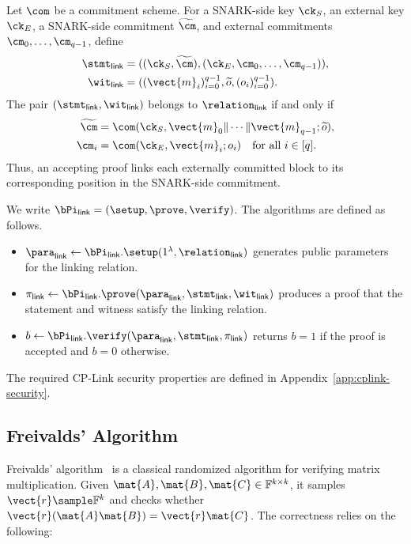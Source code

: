 Let \(\com\) be a commitment scheme. For a SNARK-side key \(\ck_S\), an
external key \(\ck_E\), a SNARK-side commitment \(\widetilde{\cm}\), and
external commitments \(\cm_0,\ldots,\cm_{q-1}\), define
\[
\begin{aligned}
\stmt_{\mathsf{link}}
&=
((\ck_S,\widetilde{\cm}),
(\ck_E,\cm_0,\ldots,\cm_{q-1})),\\
\wit_{\mathsf{link}}
&=
((\vect{m}_i)_{i=0}^{q-1},\widetilde{o},(o_i)_{i=0}^{q-1}).
\end{aligned}
\]
The pair \((\stmt_{\mathsf{link}},\wit_{\mathsf{link}})\) belongs to
\(\relation_{\mathsf{link}}\) if and only if
\[
\begin{aligned}
\widetilde{\cm}
&=
\com(\ck_S,\vect{m}_0\|\cdots\|\vect{m}_{q-1};\widetilde{o}),\\
\cm_i
&=
\com(\ck_E,\vect{m}_i;o_i)
\quad \text{for all }i\in[q].
\end{aligned}
\]
Thus, an accepting proof links each externally committed block to its
corresponding position in the SNARK-side commitment.

We write \(\bPi_{\mathsf{link}}=(\setup,\prove,\verify)\). The algorithms are
defined as follows.
\begin{itemize}[leftmargin=*,nosep]
  \item \(\para_{\mathsf{link}}\gets
  \bPi_{\mathsf{link}}.\setup(1^\lambda,\relation_{\mathsf{link}})\) generates
  public parameters for the linking relation.

  \item \(\pi_{\mathsf{link}}\gets
  \bPi_{\mathsf{link}}.\prove(
  \para_{\mathsf{link}},\stmt_{\mathsf{link}},\wit_{\mathsf{link}})\) produces
  a proof that the statement and witness satisfy the linking relation.

  \item \(b\gets\bPi_{\mathsf{link}}.\verify(
  \para_{\mathsf{link}},\stmt_{\mathsf{link}},\pi_{\mathsf{link}})\) returns
  \(b=1\) if the proof is accepted and \(b=0\) otherwise.
\end{itemize}
The required CP-Link security properties are defined in
Appendix~\ref{app:cplink-security}.

\subsection{Freivalds' Algorithm}
\label{sec:prelim-freivalds}

Freivalds' algorithm~\cite{freivalds1977probabilistic} is a classical randomized algorithm for verifying matrix multiplication.
Given $\mat{A}, \mat{B}, \mat{C} \in \mathbb{F}^{k \times k}$, it samples $\vect{r} \sample \mathbb{F}^k$ and checks whether $\vect{r}(\mat{A}\mat{B}) = \vect{r}\mat{C}$.
The correctness relies on the following:

